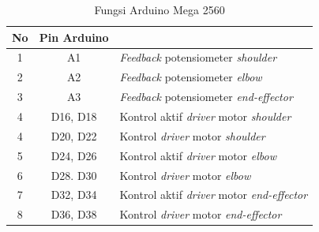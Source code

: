 \begin{longtable}{|c|c|l|}
	\caption{Fungsi Arduino Mega 2560}
	\label{tbl.pinarduino}\\
	\hline
	\rowcolor[HTML]{656565} 
	{\color[HTML]{000000} No} & {\color[HTML]{000000} Pin Arduino} & \multicolumn{1}{c|}{\cellcolor[HTML]{656565}{\color[HTML]{000000} Fungsi}} \\ \hline
	\endfirsthead
	\endhead
	1                         & A1                                 & \textit{Feedback} potensiometer \textit{shoulder}                                            \\ \hline
	2                         & A2                                 & \textit{Feedback} potensiometer \textit{elbow}                                               \\ \hline
	3                         & A3                                 & {\color[HTML]{000000} \textit{Feedback} potensiometer \textit{end-effector}}                 \\ \hline
	4                         & D16, D18                           & Kontrol aktif \textit{driver} motor \textit{shoulder}                                        \\ \hline
	4                         & D20, D22                           & Kontrol \textit{driver} motor \textit{shoulder}                                              \\ \hline
	5                         & D24, D26                           & Kontrol aktif \textit{driver} motor \textit{elbow}                                           \\ \hline
	6                         & D28. D30                           & Kontrol \textit{driver} motor \textit{elbow}                                                 \\ \hline
	7                         & D32, D34                           & Kontrol aktif \textit{driver} motor \textit{end-effector  }                                  \\ \hline
	8                         & D36, D38                           & Kontrol \textit{driver} motor \textit{end-effector }                                         \\ \hline

\end{longtable}
